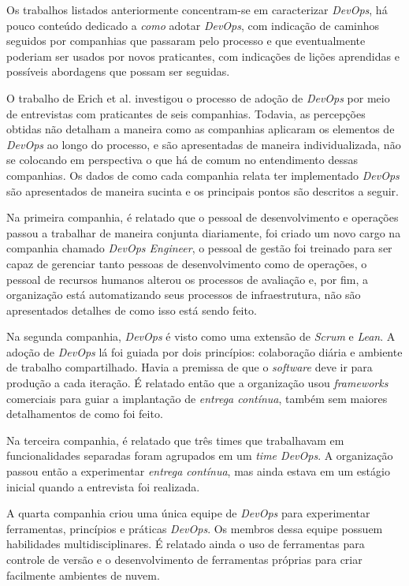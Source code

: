 Os trabalhos listados anteriormente concentram-se em caracterizar
\textit{DevOps}, há pouco conteúdo dedicado a \emph{como} adotar \textit{DevOps},
com indicação de caminhos seguidos por companhias que passaram pelo processo
e que eventualmente poderiam ser usados por novos praticantes, com indicações
de lições aprendidas e possíveis abordagens que possam ser seguidas.

O trabalho de Erich et al. \cite{qualitative_devops_journalsw_17} investigou
o processo de adoção de \textit{DevOps} por meio de entrevistas com praticantes
de seis companhias. Todavia, as percepções obtidas não detalham a maneira como
as companhias aplicaram os elementos de \textit{DevOps} ao longo do processo,
e são apresentadas de maneira individualizada, não se colocando em perspectiva
o que há de comum no entendimento dessas companhias. Os dados de como cada
companhia relata ter implementado \textit{DevOps} são apresentados de maneira
sucinta e os principais pontos são descritos a seguir.

Na primeira companhia, é relatado que o pessoal de desenvolvimento e
operações passou a trabalhar de maneira conjunta diariamente, foi criado um
novo cargo na companhia chamado \textit{DevOps Engineer}, o pessoal de gestão
foi treinado para ser capaz de gerenciar tanto pessoas de desenvolvimento como
de operações, o pessoal de recursos humanos alterou os processos de avaliação e,
por fim, a organização está automatizando seus processos de infraestrutura, não
são apresentados detalhes de como isso está sendo feito.

Na segunda companhia, \textit{DevOps} é visto como uma extensão de
\textit{Scrum} e \textit{Lean}. A adoção de \textit{DevOps} lá foi guiada por
dois princípios: colaboração diária e ambiente de trabalho compartilhado.
Havia a premissa de que o \textit{software} deve ir para produção a cada
iteração. É relatado então que a organização usou \textit{frameworks}
comerciais para guiar a implantação de \emph{entrega contínua}, também sem maiores
detalhamentos de como foi feito.

Na terceira companhia, é relatado que três times que trabalhavam em
funcionalidades separadas foram agrupados em um \emph{time DevOps}. A organização
passou então a experimentar \textit{entrega contínua}, mas ainda estava em
um estágio inicial quando a entrevista foi realizada.

A quarta companhia criou uma única equipe de \textit{DevOps} para
experimentar ferramentas, princípios e práticas \textit{DevOps}. Os
membros dessa equipe possuem habilidades multidisciplinares. É relatado ainda
o uso de ferramentas para controle de versão e o desenvolvimento de ferramentas
próprias para criar facilmente ambientes de nuvem.

